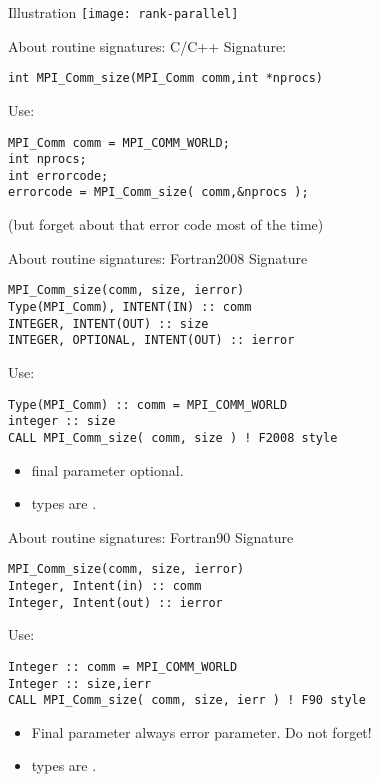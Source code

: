 \begin{numberedframe}{Illustration}
  \texttt{[image: rank-parallel]}
\end{numberedframe}

\begin{numberedframe}{About routine signatures: C/C++}
  \label{sec:protos}
Signature:
\lstset{language=C}
\begin{lstlisting}
int MPI_Comm_size(MPI_Comm comm,int *nprocs)
\end{lstlisting}
Use:
\lstset{language=C}
\begin{lstlisting}
MPI_Comm comm = MPI_COMM_WORLD;
int nprocs;
int errorcode;
errorcode = MPI_Comm_size( comm,&nprocs );
\end{lstlisting}
(but forget about that error code most of the time)
\end{numberedframe}

\begin{fortran}
\begin{numberedframe}{About routine signatures: Fortran2008}
Signature
\lstset{language=Fortran}
\begin{lstlisting}
MPI_Comm_size(comm, size, ierror)
Type(MPI_Comm), INTENT(IN) :: comm
INTEGER, INTENT(OUT) :: size
INTEGER, OPTIONAL, INTENT(OUT) :: ierror
\end{lstlisting}
Use:
\begin{lstlisting}
Type(MPI_Comm) :: comm = MPI_COMM_WORLD
integer :: size
CALL MPI_Comm_size( comm, size ) ! F2008 style
\end{lstlisting}
\begin{itemize}
\item final parameter optional.
\item {} types are .
\end{itemize}
\end{numberedframe}
\end{fortran}

\begin{fortran}
\begin{numberedframe}{About routine signatures: Fortran90}
Signature
\lstset{language=Fortran}
\begin{lstlisting}
MPI_Comm_size(comm, size, ierror)
Integer, Intent(in) :: comm
Integer, Intent(out) :: ierror
\end{lstlisting}
Use:
\begin{lstlisting}
Integer :: comm = MPI_COMM_WORLD
Integer :: size,ierr
CALL MPI_Comm_size( comm, size, ierr ) ! F90 style
\end{lstlisting}
\begin{itemize}
\item Final parameter always error parameter. Do not forget!
\item {} types are .
\end{itemize}
\end{numberedframe}
\end{fortran}

